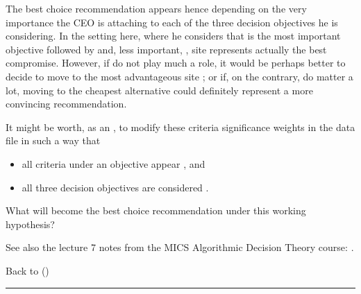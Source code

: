 \documentclass[a4paper,12pt,english]{sphinxhowto}
\begin{document}
The best choice recommendation appears hence depending on the very importance the CEO is attaching to each of the three decision objectives he is considering. In the setting here, where he considers that  is the most important objective followed by  and, less important, , site  represents actually the best compromise. However, if  do not play much a role, it would be perhaps better to decide to move to the most advantageous site ; or if, on the contrary,  do matter a lot, moving to the cheapest alternative  could definitely represent a more convincing recommendation.

It might be worth, as an , to modify these criteria significance weights in the  data file in such a way that
\begin{itemize}
\item {} 
all criteria under an objective appear , and

\item {} 
all three decision objectives are considered .

\end{itemize}

What will become the best choice recommendation under this working hypothesis?

See also the lecture 7 notes from the MICS Algorithmic Decision Theory course: .

Back to {\hyperref[\detokenize{tutorial:tutorial-label}]{}} ()


\bigskip\hrule\bigskip
\end{document}
